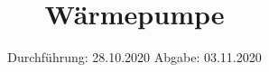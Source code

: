 

\subject{D206}
\title{Wärmepumpe}
\date{%
  Durchführung: 28.10.2020
  \hspace{3em}
  Abgabe: 03.11.2020
}



\maketitle
\thispagestyle{empty}
\tableofcontents
\newpage





\nocite{*}
\printbibliography{}



